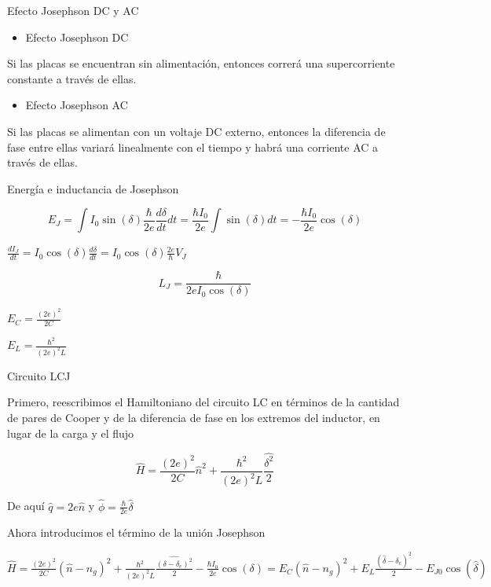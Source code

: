 \documentclass[spanish]{beamer}
\begin{document}
\begin{frame}{Efecto Josephson DC y AC}
\protect\hypertarget{efecto-josephson-dc-y-ac}{}

\begin{itemize}
\item
  Efecto Josephson DC
\end{itemize}

Si las placas se encuentran sin alimentación, entonces correrá una
supercorriente constante a través de ellas.

\begin{itemize}
\item
  Efecto Josephson AC
\end{itemize}

Si las placas se alimentan con un voltaje DC externo, entonces la
diferencia de fase entre ellas variará linealmente con el tiempo y habrá
una corriente AC a través de ellas.

\end{frame}

\begin{frame}{Energía e inductancia de Josephson}
\protect\hypertarget{energuxeda-e-inductancia-de-josephson}{}

\[E_J = \int I_0 \sin(\delta) \frac{\hbar}{2e} \frac{d\delta}{dt} dt
 = \frac{\hbar I_0}{2e} \int \sin(\delta) dt
 = - \frac{\hbar I_0}{2e} \cos(\delta)\]

\(\frac{dI_J}{dt} = I_0 \cos(\delta) \frac{d \delta}{dt} = I_0 \cos(\delta)  \frac{2e}{\hbar} V_J\)

\[L_J = \frac{\hbar}{2e I_0 \cos(\delta)}\]

\(E_C = \frac{(2e)^2}{2C}\)

\(E_L = \frac{\hbar^2}{(2e)^2L}\)

\end{frame}

\begin{frame}{Circuito LCJ}
\protect\hypertarget{circuito-lcj}{}

Primero, reescribimos el Hamiltoniano del circuito LC en términos de la
cantidad de pares de Cooper y de la diferencia de fase en los extremos
del inductor, en lugar de la carga y el flujo

\[\hat{H} = \frac{(2e)^2}{2C} \hat{n}^2 + \frac{\hbar^2}{(2e)^2L} 
 \frac{\hat{\delta^2}}{2}\]

De aquí \(\hat{q}=2e\hat{n}\) y
\(\hat{\phi}=\frac{\hbar}{2e}\hat{\delta}\)

Ahora introducimos el término de la unión Josephson

\(\hat{H} = \frac{(2e)^2}{2C} (\hat{n}-n_g)^2 + \frac{\hbar^2}{(2e)^2L}  \frac{\hat{(\delta-\delta_e)^2}}{2} - \frac{\hbar I_0}{2e} \cos(\delta)  = E_C (\hat{n}-n_g)^2 + E_L \frac{(\hat{\delta}-\delta_e)^2}{2}  - E_{J0} \cos(\hat{\delta})\)

\end{frame}
\end{document}
